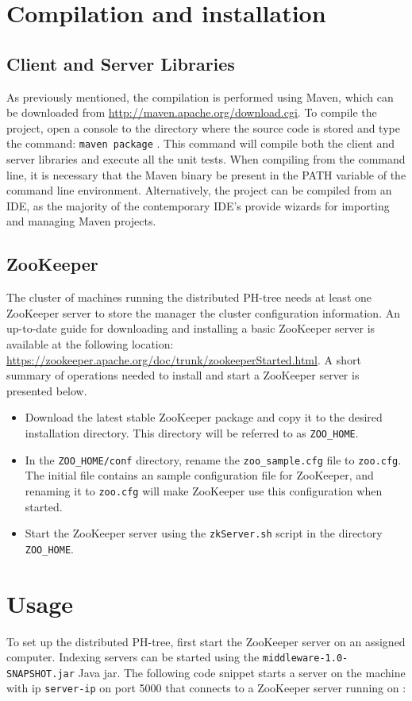 \documentclass[11pt,a4paper]{globis-book}
\begin{document}
\section{Compilation and installation} 

\subsection{Client and Server Libraries}
As previously mentioned, the compilation is performed using Maven, which can be downloaded from \url{http://maven.apache.org/download.cgi}. To compile the project, open a console to the directory where the source code is stored and type the command: \texttt{maven package} . This command will compile both the client and server libraries and execute all the unit tests. When compiling from the command line, it is necessary that the Maven binary be present in the PATH variable of the command line environment. Alternatively, the project can be compiled from an IDE, as the majority of the contemporary IDE's provide wizards for importing and managing Maven projects.

\subsection{ZooKeeper}
The cluster of machines running the distributed PH-tree needs at least one ZooKeeper server to store the manager the cluster configuration information. An up-to-date guide for downloading and installing a basic ZooKeeper server is available at the following location: \url{https://zookeeper.apache.org/doc/trunk/zookeeperStarted.html}. 
A short summary of operations needed to install and start a ZooKeeper server is presented below.
\begin{itemize}
    \item Download the latest stable ZooKeeper package and copy it to the desired installation directory. This directory will be referred to as \texttt{ZOO\_HOME}.
    \item In the \texttt{ZOO\_HOME/conf} directory, rename the \texttt{zoo\_sample.cfg} file to \texttt{zoo.cfg}. The initial file contains an sample configuration file for ZooKeeper, and renaming it to \texttt{zoo.cfg} will make ZooKeeper use this configuration when started.
    \item Start the ZooKeeper server using the \texttt{zkServer.sh} script in the directory \texttt{ZOO\_HOME}.
\end{itemize}

\section{Usage}
To set up the distributed PH-tree, first start the ZooKeeper server on an assigned computer. Indexing servers can be started using the \texttt{middleware-1.0-SNAPSHOT.jar} Java jar.
The following code snippet starts a server on the machine with ip \texttt{server-ip} on port 5000 that connects to a ZooKeeper server running on  : 
\end{document}
